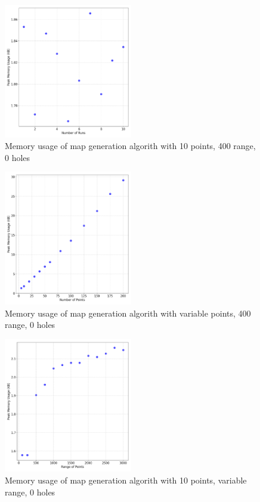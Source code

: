 \documentclass[final]{cmpreport_02}
\begin{document}
\begin{figure}[h!]
	\centering
	\includegraphics[width=0.5\textwidth]{./images/mapGenBaselineMem.png}
	\caption{Memory usage of map generation algorith with 10 points, 400 range, 0 holes}
	\label{PE:mg:memBaseline}
\end{figure}

\begin{figure}[h!]
	\centering
	\includegraphics[width=0.5\textwidth]{./images/mapGenPointsMem.png}
	\caption{Memory usage of map generation algorith with variable points, 400 range, 0 holes}
	\label{PE:mg:memPoints}
\end{figure}

\begin{figure}[h!]
	\centering
	\includegraphics[width=0.5\textwidth]{./images/mapGenRangeMem.png}
	\caption{Memory usage of map generation algorith with 10 points, variable range, 0 holes}
	\label{PE:mg:memRange}
\end{figure}
\end{document}
